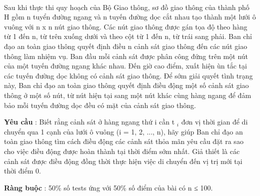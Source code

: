  

Sau khi thực thi quy hoạch của Bộ Giao thông, sơ đồ giao thông của thành phố H gồm n tuyển đường ngang và n tuyến đường dọc cắt nhau tạo thành một lưới ô vuông với n x n nút giao thông. Các nút giao thông được gán tọa độ theo hàng từ 1 đến n, từ trên xuống dưới và theo cột từ 1 đến n, từ trái sang phải. Ban chỉ đạo an toàn giao thông quyết định điều n cảnh sát giao thông đến các nút giao thông làm nhiệm vụ. Ban đầu mỗi cảnh sát được phân công đứng trên một nút của một tuyến đường ngang khác nhau. Đến giờ cao điểm, xuất hiện ùn tắc tại các tuyến đường dọc không có cảnh sát giao thông. Để sớm giải quyết tình trạng này, Ban chỉ đạo an toàn giao thông quyết định điều động một số cảnh sát giao thông ở một số nút, từ nút hiện tại sang một nút khác cùng hàng ngang để đảm bảo mỗi tuyến đường dọc đều có mặt của cảnh sát giao thông.

\textbf{Yêu cầu } : Biết rằng cảnh sát ở hàng ngang thứ i cần t $_ i $ đơn vị thời gian để di chuyển qua 1 cạnh của lưới ô vuông (i = 1, 2, ..., n), hãy giúp Ban chỉ đạo an toàn giao thông tìm cách điều động các cảnh sát thỏa mãn yêu cầu đặt ra sao cho việc điều động được hoàn thành tại thời điểm sớm nhất. Giả thiết là các cảnh sát được điều động đồng thời thực hiện việc di chuyển đến vị trị mới tại thời điểm 0.

\textbf{Ràng buộc } : 50\% số tests ứng với 50\% số điểm của bài có n ≤ 100.